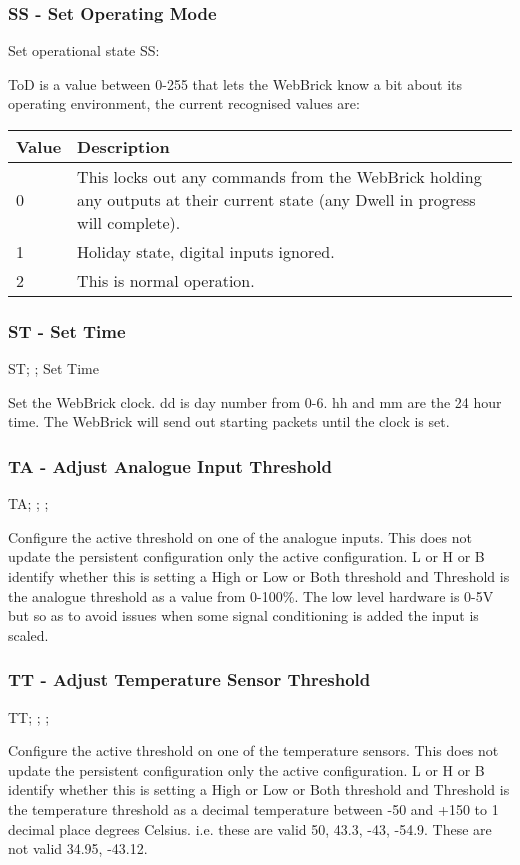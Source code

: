 \subsubsection{SS - Set Operating Mode}
Set operational state
SS:

ToD is a value between 0-255 that lets the WebBrick know a bit about its operating environment, 
the current recognised values are:

\begin{tabular}{l|p{12cm}}
Value&Description\\
\hline
0&This locks out any commands from the WebBrick holding any outputs at their current state (any Dwell in progress will complete).\\
1&Holiday state, digital inputs ignored.\\
2&This is normal operation.\\
\end{tabular}

\subsubsection{ST - Set Time}
ST; ;   Set Time

Set the WebBrick clock. dd is day number from 0-6. hh and mm are the 24 hour time. The WebBrick will
send out starting packets until the clock is set.

\subsubsection{TA - Adjust Analogue Input Threshold}
TA; ; ;

Configure the active threshold on one of the analogue inputs. This does not update the persistent configuration
only the active configuration.
L or H or B identify whether this is setting a High or Low or Both threshold and Threshold is the analogue threshold
as a value from 0-100\%. The low level hardware is 0-5V but so as to avoid issues when some signal
conditioning is added the input is scaled.

\subsubsection{TT - Adjust Temperature Sensor Threshold}
TT; ; ;

Configure the active threshold on one of the temperature sensors. This does not update the persistent configuration
only the active configuration.
L or H or B identify whether this is setting a High or Low or Both threshold and Threshold is the temperature threshold
as a decimal temperature between -50 and +150 to 1 decimal place degrees Celsius. 
i.e. these are valid 50, 43.3, -43, -54.9. These are not valid 34.95, -43.12.
